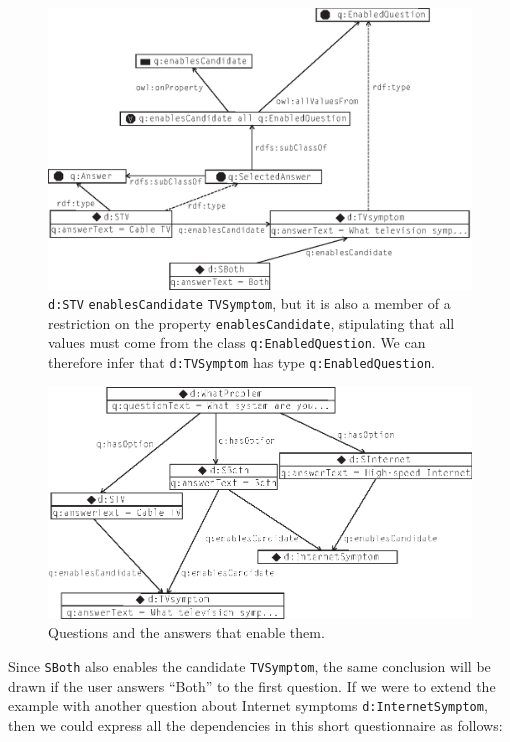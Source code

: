 \begin{figure}
\centering
\includegraphics[width=5in]{media/ch12/f12-04.eps}
\caption{\texttt{d:STV} \texttt{enablesCandidate} \texttt{TVSymptom}, but it is also a member of a
restriction on the property \texttt{enablesCandidate}, stipulating that all
values must come from the class \texttt{q:EnabledQuestion}. We can therefore
infer that \texttt{d:TVSymptom} has type \texttt{q:EnabledQuestion}. 
}
\label{fig:ch12.04}
\end{figure}



\begin{figure}
\centering
\includegraphics[width=5in]{media/ch12/f12-05.eps}
\caption{Questions and the answers that enable them.}
\label{fig:ch12.05}
\end{figure}



Since \texttt{SBoth} also enables the candidate \texttt{TVSymptom}, the same conclusion
will be drawn if the user answers ``Both'' to the first question. If we
were to extend the example with another question about Internet symptoms
\texttt{d:InternetSymptom}, then we could express all the dependencies in this
short questionnaire as follows:

